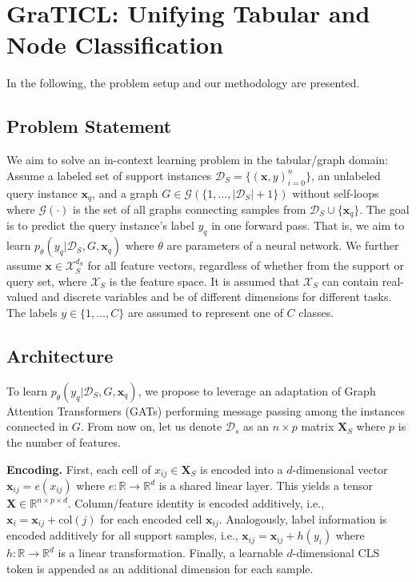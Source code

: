 \documentclass{article} %
\begin{document}
\section{GraTICL: Unifying Tabular and Node Classification}
In the following, the problem setup and our methodology are presented.

\subsection{Problem Statement}
We aim to solve an in-context learning problem in the tabular/graph domain: Assume a labeled set of support instances $\mathcal{D}_S = \{(\mathbf{x}, y)_{i=0}^n \}$, an unlabeled query instance $\mathbf{x}_q$, and a graph $G \in \mathcal{G}(\{1, \dots, |\mathcal{D}_S| + 1\})$ without self-loops where $\mathcal{G}(\cdot)$ is the set of all graphs connecting samples from $\mathcal{D}_S \cup \{\mathbf{x}_q\}$. The goal is to predict the query instance's label $y_q$ in one forward pass. That is, we aim to learn $p_{\theta}(y_q | \mathcal{D}_S, G, \mathbf{x}_q)$ where $\theta$ are parameters of a neural network. We further assume $\mathbf{x} \in \mathcal{X}_S^{d_S}$ for all feature vectors, regardless of whether from the support or query set, where $\mathcal{X}_S$ is the feature space. It is assumed that $\mathcal{X}_S$ can contain real-valued and discrete variables and be of different dimensions for different tasks. The labels $y \in \{1, \dots, C\}$ are assumed to represent one of $C$ classes.

\subsection{Architecture}
To learn $p_{\theta}(y_q | \mathcal{D}_S, G, \mathbf{x}_q)$, we propose to leverage an adaptation of Graph Attention Transformers (GATs) performing message passing among the instances connected in $G$. From now on, let us denote $\mathcal{D}_s$ as an $n \times p$ matrix $\mathbf{X}_S$ where $p$ is the number of features. 

\textbf{Encoding.} First, each cell of $x_{i j} \in \mathbf{X}_S$ is encoded into a $d$-dimensional vector $\mathbf{x}_{i j} = e(x_{i j})$ where $e: \mathbb{R} \rightarrow \mathbb{R}^d$ is a shared linear layer. This yields a tensor $\mathbf{X} \in \mathbb{R}^{n \times p \times d}$. Column/feature identity is encoded additively, i.e., $\mathbf{x}_i = \mathbf{x}_{i j} + \text{col}(j)$ for each encoded cell $\mathbf{x}_{i j}$. Analogously, label information is encoded additively for all support samples, i.e., $\mathbf{x}_{i j} = \mathbf{x}_{i j} + h(y_i)$ where $h: \mathbb{R} \rightarrow \mathbb{R}^d$ is a linear transformation. Finally, a learnable $d$-dimensional $\text{CLS}$ token is appended as an additional dimension for each sample.
\end{document}
